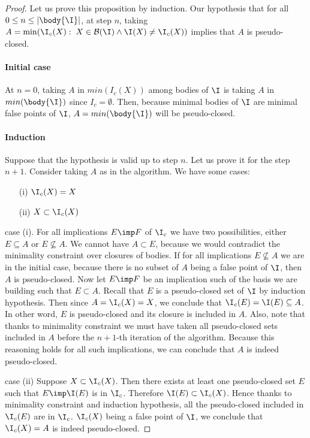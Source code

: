 \begin{proof} Let us prove this proposition by induction. Our hypothesis that
for all $0 \leq n \leq | \body{\I} |$, at step $n$, taking $A = \min(\I_c(X): 
\; X \in \mathcal{B}(\I) \land \I(X) \neq \I_c(X))$ implies that $A$ is
pseudo-closed.

\vspace{1.2em}

\paragraph{Initial case} At $n = 0$, taking $A$ in $min(I_c(X))$ among bodies 
of $\I$ is taking $A$ in $min(\body{\I})$ since $I_c = \emptyset$. Then, because
minimal bodies of $\I$ are minimal false points of $\I$, $A = min(\body{\I})$
will be pseudo-closed.

\vspace{1.2em}

\paragraph{Induction} Suppose that the hypothesis is valid up to step $n$. Let
us prove it for the step $n + 1$. Consider taking $A$ as in the algorithm. We
have some cases:
\begin{itemize}
	\item[(i)] $\I_c(X) = X$
	\item[(ii)] $X \subset \I_c(X)$
\end{itemize}
\noindent case (i). For all implications $E \imp F$ of $\I_c$ we have two 
possibilities, either $E \subseteq A$ or $E \nsubseteq A$. We cannot have
$A \subset E$, because we would contradict the minimality constraint over 
closures of bodies. If for all implications $E \nsubseteq A$ we are in the
initial case, because there is no subset of $A$ being a false point of $\I$,
then $A$ is pseudo-closed. Now let $E \imp F$ be an implication such of the 
basis we are building such that $E \subset A$. Recall that $E$ is a 
pseudo-closed set of $\I$ by induction hypothesis. Then since $A = \I_c(X) = X$,
we conclude that $\I_c(E) = \I(E) \subseteq A$. In other word, $E$ is 
pseudo-closed and its closure is included in $A$. Also, note that thanks to
minimality constraint we must have taken all pseudo-closed sets included in $A$
before the $n+1$-th iteration of the algorithm. Because this reasoning holds
for all such implications, we can conclude that $A$ is indeed pseudo-closed.

case (ii) Suppose $X \subset \I_c(X)$. Then there exists at least one 
pseudo-closed set $E$ such that $E \imp \I(E)$ is in $\I_c$. Therefore $\I(E) 
\subset \I_c(X)$. Hence thanks to minimality constraint and induction 
hypothesis, all the pseudo-closed included in $\I_c(E)$ are in $\I_c$. $\I_c(X)$
being a false point of $\I$, we conclude that $\I_c(X) = A$ is indeed 
pseudo-closed.


\end{proof}
